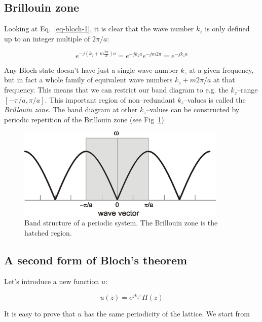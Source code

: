 \subsection{Brillouin zone}

Looking at Eq.~\ref{eq-bloch-1}, it is clear that the wave number $k_z$ is only defined up to an integer multiple of $2 \pi/a$:

\begin{equation}
e^{-j (k_z + m\frac{2 \pi}{a} ) a} = e^{-j k_z a} e^{-j m 2 \pi} = e^{-j k_z a}
\end{equation} 

Any Bloch state doesn't have just a single wave number $k_z$ at a given frequency, but in fact a whole family of equivalent wave numbers $k_z+m 2 \pi /a$ at that frequency. This means that we can restrict our band diagram to e.g. the $k_z$--range $[-\pi/a,\pi/a]$. This important region of non--redundant $k_z$--values is called the \emph{Brillouin zone}. The band diagram at other $k_z$--values can be constructed by periodic repetition of the Brillouin zone (see Fig~\ref{fig-band-folding}).

\begin{figure}
\centering
\includegraphics[width=10cm]{periodic/figures/band_folding}
\caption{Band structure of a periodic system. The Brillouin zone is the hatched region.}
\label{fig-band-folding}
\end{figure}

\subsection{A second form of Bloch's theorem}

Let's introduce a new function $u$:

\begin{equation}
u(z) = e^{j k_z z} H(z) \label{eq-bloch-u}
\end{equation} 

It is easy to prove that $u$ has the same periodicity of the lattice. We start from

